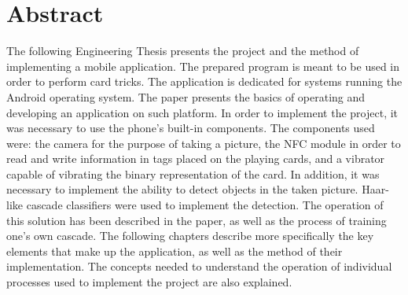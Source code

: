 \section*{Abstract}
The following Engineering Thesis presents the project and the method of implementing a mobile application. The prepared program is meant to be used in order to perform card tricks. The application is dedicated for systems running the Android operating system. The paper presents the basics of operating and developing an application on such platform.  In order to implement the project, it was necessary to use the phone's built-in components. The components used were: the camera for the purpose of taking a picture, the NFC module in order to read and write information in tags placed on the playing cards, and a vibrator capable of vibrating the binary representation of the card. In addition, it was necessary to implement the ability to detect objects in the taken picture. Haar-like cascade classifiers were used to implement the detection. The operation of this solution has been described in the paper, as well as the process of training one's own cascade. The following chapters describe more specifically the key elements that make up the application, as well as the method of their implementation. The concepts needed to understand the operation of individual processes used to implement the project are also explained.
